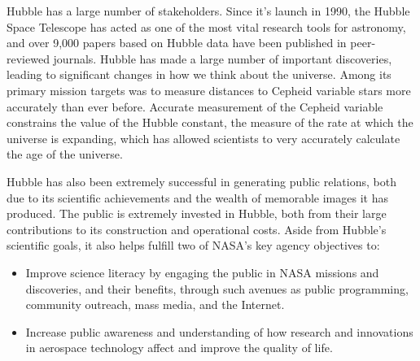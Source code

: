 \documentclass[onecolumn,10pt]{jhwhw}
\begin{document}
Hubble has a large number of stakeholders. Since it's launch in 1990, the Hubble Space Telescope has acted as one of the most vital research tools for astronomy, and over 9,000 papers based on Hubble data have been published in peer-reviewed journals. Hubble has made a large number of important discoveries, leading to significant changes in how we think about the universe. Among its primary mission targets was to measure distances to Cepheid variable stars more accurately than ever before. Accurate measurement of the Cepheid variable constrains the value of the Hubble constant, the measure of the rate at which the universe is expanding, which has allowed scientists to very accurately calculate the age of the universe.

Hubble has also been extremely successful in generating public relations, both due to its scientific achievements and the wealth of memorable images it has produced. The public is extremely invested in Hubble, both from their large contributions to its construction and operational costs. Aside from Hubble's scientific goals, it also helps fulfill two of NASA's key agency objectives to:
\begin{itemize}
\setlength\itemsep{0em}
\item Improve science literacy by engaging the public in NASA missions and discoveries, and their benefits, through such avenues as public programming, community outreach, mass media, and the Internet.
\item Increase public awareness and understanding of how research and innovations in aerospace technology affect and improve the quality of life.
\end{itemize}
\end{document}
